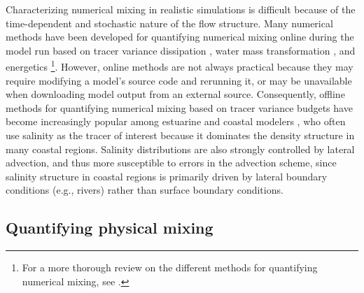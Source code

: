 \documentclass[draft]{agujournal2019}
\begin{document}
Characterizing numerical mixing in realistic simulations is difficult because of the time-dependent and stochastic nature of the flow structure. Many numerical methods have been developed for quantifying numerical mixing online during the model run based on tracer variance dissipation \cite{Burchard_2008, Klingbeil_2014}, water mass transformation \cite{Holmes_2021, Urakawa_2014}, and energetics \cite{Ilicak_2012, Petersen_2015}\footnote{For a more thorough review on the different methods for quantifying numerical mixing, see .}. However, online methods are not always practical because they may require modifying a model's source code and rerunning it, or may be unavailable when downloading model output from an external source. Consequently, offline methods for quantifying numerical mixing based on tracer variance budgets have become increasingly popular among estuarine and coastal modelers \cite{Li_2018, MacCready_2018, Wang_2017, Wang_2021}, who often use salinity as the tracer of interest because it dominates the density structure in many coastal regions. Salinity distributions are also strongly controlled by lateral advection, and thus more susceptible to errors in the advection scheme, since salinity structure in coastal regions is primarily driven by lateral boundary conditions (e.g., rivers) rather than surface boundary conditions. 

\subsection{Quantifying physical mixing}
\end{document}
